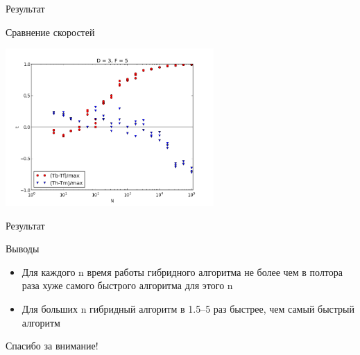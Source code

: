\documentclass{beamer}
\begin{document}
\begin{frame}{Результат}
\begin{block}{Сравнение скоростей}
\begin{center}
\includegraphics*[height=6cm]{pic/result.png}
\end{center}
\end{block}
\end{frame}


\begin{frame}{Результат}
\begin{block}{Выводы}
\begin{itemize}
\item {Для каждого n время работы гибридного алгоритма не более чем в полтора раза хуже самого быстрого алгоритма для этого n}
\item {Для больших n гибридный алгоритм в 1.5--5 раз быстрее, чем самый быстрый алгоритм}
\end{itemize}
\end{block}
\end{frame}

\begin{frame}{}
\begin{center}
Спасибо за внимание!
\end{center}
\end{frame}

\appendix

%
\end{document}
